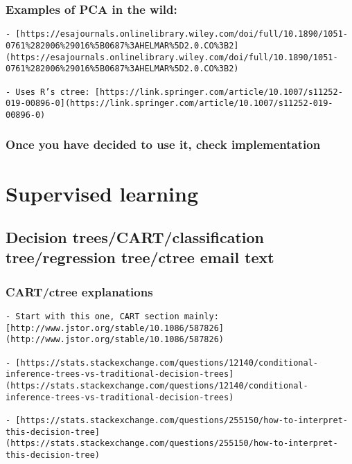 \documentclass[
]{book}
\begin{document}
\hypertarget{examples-of-pca-in-the-wild}{%
\subsection{Examples of PCA in the wild:}\label{examples-of-pca-in-the-wild}}

\begin{verbatim}
- [https://esajournals.onlinelibrary.wiley.com/doi/full/10.1890/1051-0761%282006%29016%5B0687%3AHELMAR%5D2.0.CO%3B2](https://esajournals.onlinelibrary.wiley.com/doi/full/10.1890/1051-0761%282006%29016%5B0687%3AHELMAR%5D2.0.CO%3B2)
    
- Uses R’s ctree: [https://link.springer.com/article/10.1007/s11252-019-00896-0](https://link.springer.com/article/10.1007/s11252-019-00896-0)
\end{verbatim}

\hypertarget{once-you-have-decided-to-use-it-check-implementation}{%
\subsection{Once you have decided to use it, check implementation}\label{once-you-have-decided-to-use-it-check-implementation}}

\hypertarget{supervised-learning}{%
\chapter*{Supervised learning}\label{supervised-learning}}

\hypertarget{decision-treescartclassification-treeregression-treectree-email-text}{%
\section{Decision trees/CART/classification tree/regression tree/ctree email text}\label{decision-treescartclassification-treeregression-treectree-email-text}}

\hypertarget{cartctree-explanations-1}{%
\subsection{CART/ctree explanations}\label{cartctree-explanations-1}}

\begin{verbatim}
- Start with this one, CART section mainly: [http://www.jstor.org/stable/10.1086/587826](http://www.jstor.org/stable/10.1086/587826)
    
- [https://stats.stackexchange.com/questions/12140/conditional-inference-trees-vs-traditional-decision-trees](https://stats.stackexchange.com/questions/12140/conditional-inference-trees-vs-traditional-decision-trees)
    
- [https://stats.stackexchange.com/questions/255150/how-to-interpret-this-decision-tree](https://stats.stackexchange.com/questions/255150/how-to-interpret-this-decision-tree)
    
\end{verbatim}
\end{document}
